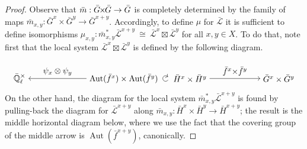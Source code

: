 \documentclass[11pt]{amsart}
\theoremstyle{plain}
\theoremstyle{definition}
\theoremstyle{remark}
\newcommand{\EE}{\mathbb{\bar Q}_\ell}
\newcommand{\EEx}{\EE^\times}
\DeclareMathOperator{\Aut}{Aut}
\newcommand{\iso}{{\ \cong\ }}
\newcommand{\gcs}[1]{{\mathcal{\bar #1}}}
\renewcommand{\bf}{\bar{f}}
\newcommand{\bm}{\bar{m}}
\newcommand{\bG}{\bar{G}}
\newcommand{\bH}{\bar{H}}
\newcommand{\tight}[3]{\hspace{-#1pt}{#2}\hspace{-#3pt}}
\newcommand{\bGxG}{\text{$\bar{G} \tight{1}{\times}{1} \bar{G}$}}
\begin{document}
\begin{proof}
  Observe that $\bm: \bGxG \to \bG$ is
  completely determined by the family of maps
  $\bm_{x,y} : \bG^x \times \bG^{y} \to \bG^{x+y}$.
  Accordingly, to define $\mu$ for $\gcs{L}$ it is sufficient to define isomorphisms
  $\mu_{x,y} : \bm_{x,y}^*\gcs{L}^{x+y} \iso \gcs{L}^{x}\boxtimes \gcs{L}^{y}$
  for all $x,y\in X$. To do that, note first that the local system
  $\gcs{L}^{x}\boxtimes \gcs{L}^{y}$ is defined by the following diagram.
  \[
  \begin{tikzpicture}[auto,style={rectangle}]
  \node (0) at (0,0) {$\EEx$};
  \node (1) [anchor=east] at (6,0) {$\Aut(\bf^x) \times \Aut(\bf^y)$};
  \node (2) [anchor=west] at (6.4,0) {$\bH^x \times \bH^y$};
  \node (3) at (11,0) {$\bG^x \times \bG^y$};
  \draw [->] (1) to node[swap, label] {$\psi_x \otimes \psi_y$} (0);
  \draw [->] (6.3,-0.06) arc (330:40:0.12) -- (6.3,0.07);
  \draw [->] (2) to node[label] {$\bf^x \tight{0}{\times}{0} \bf^y$} (3);
  \end{tikzpicture}
  \]
  On the other hand, the diagram for the local system $\bm_{x,y}^* \gcs{L}^{x+y}$
  is found by pulling-back the diagram for $\gcs{L}^{x+y}$ along
  $\bm_{x,y} : \bH^x\times\bH^y \to \bH^{x+y}$;
  the result is the middle horizontal diagram below, where we use the
  fact that the covering group of the middle arrow is $\Aut(\bf^{x+y})$, canonically.
  
  \vspace{0.2in}
  

\end{proof}
\end{document}
